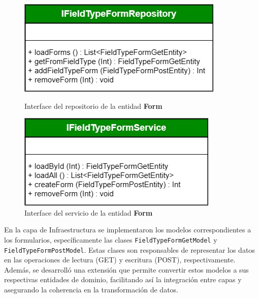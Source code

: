 \documentclass{article}
\begin{document}
\begin{figure}[H]
  \centering
  \begin{minipage}[b]{0.45\textwidth}
    \centering
    \includegraphics[width=\textwidth]{images/iform_repo.jpg}
    \caption{Interface del repositorio de la entidad \textbf{Form}}
    \label{fig:iformrepo}
  \end{minipage}
  \hspace{0.02\textwidth}
  \begin{minipage}[b]{0.45\textwidth}
    \centering
    \includegraphics[width=\textwidth]{images/iformservice.jpg}
    \caption{Interface del servicio de la entidad \textbf{Form}}
    \label{fig:formservice}
  \end{minipage}
\end{figure}

En la capa de Infraestructura se implementaron los modelos correspondientes a los formularios, específicamente las clases \texttt{FieldTypeFormGetModel} y \texttt{FieldTypeFormPostModel}. Estas clases son responsables de representar los datos en las operaciones de lectura (GET) y escritura (POST), respectivamente. Además, se desarrolló una extensión que permite convertir estos modelos a sus respectivas entidades de dominio, facilitando así la integración entre capas y asegurando la coherencia en la transformación de datos.
\end{document}
